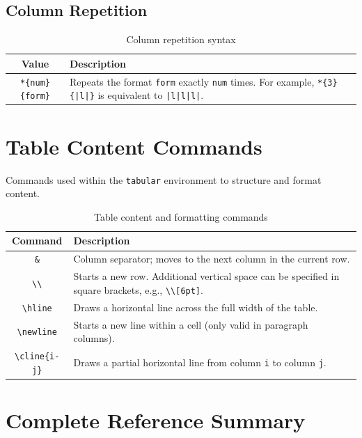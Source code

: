 \documentclass[12pt]{article}
\begin{document}
	\subsection*{Column Repetition}
	\begin{table}[h]
		\centering
		\begin{tabular}{|c|p{10cm}|}
			\hline
			\textbf{Value} & \textbf{Description} \\
			\hline
			\texttt{*\{num\}\{form\}} & Repeats the format \texttt{form} exactly \texttt{num} times. For example, \texttt{*\{3\}\{|l|\}} is equivalent to \texttt{|l|l|l|}. \\
			\hline
		\end{tabular}
		\caption{Column repetition syntax}
		\label{tab:repeat}
	\end{table}
	
	\section{Table Content Commands}
	Commands used within the \texttt{tabular} environment to structure and format content.
	
	\begin{table}[h]
		\centering
		\begin{tabular}{|c|p{10cm}|}
			\hline
			\textbf{Command} & \textbf{Description} \\
			\hline
			\texttt{\&} & Column separator; moves to the next column in the current row. \\
			\hline
			\texttt{\textbackslash\textbackslash} & Starts a new row. Additional vertical space can be specified in square brackets, e.g., \texttt{\textbackslash\textbackslash[6pt]}. \\
			\hline
			\texttt{\textbackslash hline} & Draws a horizontal line across the full width of the table. \\
			\hline
			\texttt{\textbackslash newline} & Starts a new line within a cell (only valid in paragraph columns). \\
			\hline
			\texttt{\textbackslash cline\{i-j\}} & Draws a partial horizontal line from column \texttt{i} to column \texttt{j}. \\
			\hline
		\end{tabular}
		\caption{Table content and formatting commands}
		\label{tab:commands}
	\end{table}
	
	\section{Complete Reference Summary}
	
\end{document}
